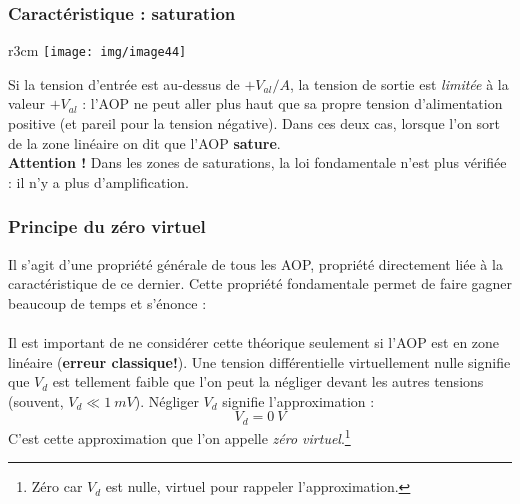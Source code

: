 \subsubsection{Caractéristique : saturation}
\begin{wrapfigure}[8]{r}{3cm}
\texttt{[image: img/image44]}
\end{wrapfigure}
Si la tension d'entrée est au-dessus de $+V_{al}/A$, la tension de sortie est \textit{limitée} à la valeur $+V_{al}$ : l'AOP ne peut aller plus haut que sa propre tension d'alimentation positive (et pareil pour la tension négative). Dans ces deux cas, lorsque l'on sort de la zone linéaire on dit que l'AOP \textbf{sature}.\\
\textbf{Attention !} Dans les zones de saturations, la loi fondamentale n'est plus vérifiée : il n'y a plus d'amplification.




\subsubsection{Principe du zéro virtuel}
Il s'agit d'une propriété générale de tous les AOP, propriété directement liée à la caractéristique de ce dernier. Cette propriété fondamentale permet de faire gagner beaucoup de temps et s'énonce :\\

\ \\

Il est important de ne considérer cette théorique seulement si l'AOP est en zone linéaire (\textbf{erreur classique!}). Une tension différentielle virtuellement nulle signifie que $V_d$ est tellement faible que l'on peut la négliger devant les autres tensions (souvent, $V_d \ll 1\ mV$). Négliger $V_d$ signifie l'approximation :
\begin{equation}
V_d = 0\ V
\end{equation}
C'est cette approximation que l'on appelle \textit{zéro virtuel}.\footnote{Zéro car $V_d$ est nulle, virtuel pour rappeler l'approximation.}


